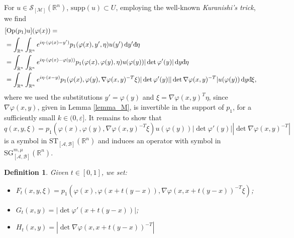 \documentclass[11pt,reqno]{amsart}
\numberwithin{equation}{section}
\newcommand{\dbar}{\mathrm{d}\hspace*{-0.15em}\bar{}\hspace*{0.1em}}
\newtheorem{definition}[theorem]{Definition}
\newcommand{\R}{{\mathbb{R}}} %
\newcommand{\caS}{{\mathcal{S}}}
\newcommand{\SG}{{\mathrm{SG}}}
\newcommand{\ST}{{\mathrm{ST}}}
\newcommand{\M}{{\mathcal{M}}} %
\newcommand{\A}{{\mathcal{A}}} %
\newcommand{\B}{{\mathcal{B}}} %
\begin{document}
For $u\in\caS_{[\M]}(\R^n)$, $\mathrm{supp}(u)\subset U$, employing the well-known \textit{Kuranishi's trick}, we find
\begin{align*}
	& [\mathrm{Op}(p_1)u](\varphi(x)) =\\
	& = \int_{\mathbb{R}^n}\int_{\mathbb{R}^n} e^{i\eta\cdot(\varphi(x)-y')}p_1(\varphi(x),y',\eta)u(y')\,\mathrm{d} y'\dbar\eta\\
	& = \int_{\mathbb{R}^n}\int_{\mathbb{R}^n} e^{i\eta\cdot(\varphi(x)-\varphi(y))}p_1(\varphi(x),\varphi(y),\eta)u(\varphi(y))|\det\varphi'(y)|\,\mathrm{d} y\dbar\eta\\
	& = \int_{\mathbb{R}^n}\int_{\mathbb{R}^n} e^{i\eta\cdot(x-y)}p_1(\varphi(x),\varphi(y), \nabla\varphi(x,y)^{-T}\xi)|\det\varphi'(y)||\det \nabla\varphi(x,y)^{-T}| u(\varphi(y)) \,\mathrm{d} y\dbar\xi,
\end{align*}
%
where we used the substitutions $y'=\varphi(y)$ and $\xi= \nabla\varphi(x,y)^T\eta$, since $\nabla\varphi(x,y)$, given in Lemma \ref{lemma_M},
is invertible in the support of $p_1$, for a sufficiently small $k\in(0,\varepsilon]$. It remains to show that
\[q(x,y,\xi) = p_1(\varphi(x),\varphi(y), \nabla\varphi(x,y)^{-T}\xi) u(\varphi(y)) |\det\varphi'(y)| |\det \nabla\varphi(x,y)^{-T}|\]
is a symbol in $\ST_{[\A,\B]}(\mathbb{R}^n)$ and induces an operator with symbol in ${\SG}_{[\A,\B]}^{m,\mu}(\mathbb{R}^n)$.

\begin{definition}
	Given $t\in[0,1]$, we set:
	\begin{itemize}
		\item $F_t(x,y,\xi) = p_1(\varphi(x),\varphi(x+t(y-x)), \nabla\varphi(x,x+t(y-x))^{-T}\xi)$;
		\item $G_t(x,y) = |\det\varphi'(x+t(y-x))|$;
		\item $H_t(x,y) = |\det \nabla\varphi(x,x+t(y-x))^{-T}|$
	\end{itemize}
\end{definition}
\end{document}
